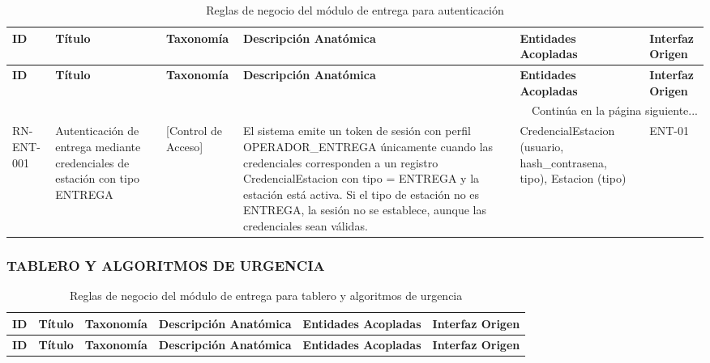 \begin{landscape}
\begin{longtable}[c]{l p{2.1cm} p{2.1cm} p{8cm} p{4cm} p{3cm}}
\caption{Reglas de negocio del módulo de entrega para autenticación} \label{tab:reglas-negocio-entrega-autenticacion}\\
\toprule
\textbf{ID} & \textbf{Título} & \textbf{Taxonomía} & \textbf{Descripción Anatómica} & \textbf{Entidades Acopladas} & \textbf{Interfaz Origen} \\
\midrule
\endfirsthead

\toprule
\textbf{ID} & \textbf{Título} & \textbf{Taxonomía} & \textbf{Descripción Anatómica} & \textbf{Entidades Acopladas} & \textbf{Interfaz Origen} \\
\midrule
\endhead

\midrule
\multicolumn{6}{r}{\small Continúa en la página siguiente...} \\
\endfoot
\bottomrule
\endlastfoot

RN-ENT-001 & Autenticación de entrega mediante credenciales de estación con tipo ENTREGA & [Control de Acceso] & El sistema emite un token de sesión con perfil OPERADOR\_ENTREGA únicamente cuando las credenciales corresponden a un registro CredencialEstacion con tipo = ENTREGA y la estación está activa. Si el tipo de estación no es ENTREGA, la sesión no se establece, aunque las credenciales sean válidas. & CredencialEstacion (usuario, hash\_contrasena, tipo), Estacion (tipo) & ENT-01 \\
\end{longtable}
\endgroup

\subsubsection{TABLERO Y ALGORITMOS DE URGENCIA}
\begingroup
\setlength{\LTleft}{\fill}
\setlength{\LTright}{\fill}

\begin{longtable}[c]{l p{2.1cm} p{2.1cm} p{8cm} p{4cm} p{3cm}}
\caption{Reglas de negocio del módulo de entrega para tablero y algoritmos de urgencia} \label{tab:reglas-negocio-entrega-tablero-urgencia}\\
\toprule
\textbf{ID} & \textbf{Título} & \textbf{Taxonomía} & \textbf{Descripción Anatómica} & \textbf{Entidades Acopladas} & \textbf{Interfaz Origen} \\
\midrule
\endfirsthead

\toprule
\textbf{ID} & \textbf{Título} & \textbf{Taxonomía} & \textbf{Descripción Anatómica} & \textbf{Entidades Acopladas} & \textbf{Interfaz Origen} \\
\midrule
\endhead


\end{longtable}
\end{landscape}
